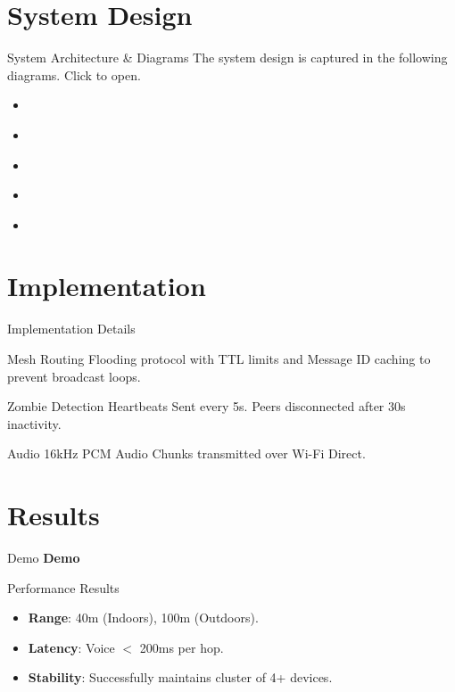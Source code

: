 \documentclass[aspectratio=169]{beamer}
\begin{document}
\section{System Design}
\begin{frame}{System Architecture & Diagrams}
    The system design is captured in the following diagrams. Click to open.
    \vspace{0.5cm}
    \begin{itemize}
        \item \href{run:./diagrams/class_structure.pdf}{}
        \item \href{run:./diagrams/use_case_diagram.png}{}
        \item \href{run:./diagrams/sequence_diagram.pdf}{}
        \item \href{run:./diagrams/swimlane_diagram.pdf}{}
        \item \href{run:./diagrams/database_schema.pdf}{}
    \end{itemize}
\end{frame}

\section{Implementation}
\begin{frame}{Implementation Details}
    \begin{block}{Mesh Routing}
        Flooding protocol with TTL limits and Message ID caching to prevent broadcast loops.
    \end{block}
    
    \begin{block}{Zombie Detection}
        Heartbeats Sent every 5s. Peers disconnected after 30s inactivity.
    \end{block}
    
    \begin{block}{Audio}
        16kHz PCM Audio Chunks transmitted over Wi-Fi Direct.
    \end{block}
\end{frame}

\section{Results}
\begin{frame}{Demo}
    \vfill
    \centering
    {\Huge\bfseries Demo}
    \vfill
\end{frame}
\begin{frame}{Performance Results}
    \begin{itemize}
        \item \textbf{Range}: 40m (Indoors), 100m (Outdoors).
        \item \textbf{Latency}: Voice $<$ 200ms per hop.
        \item \textbf{Stability}: Successfully maintains cluster of 4+ devices.
    \end{itemize}
\end{frame}
\end{document}

